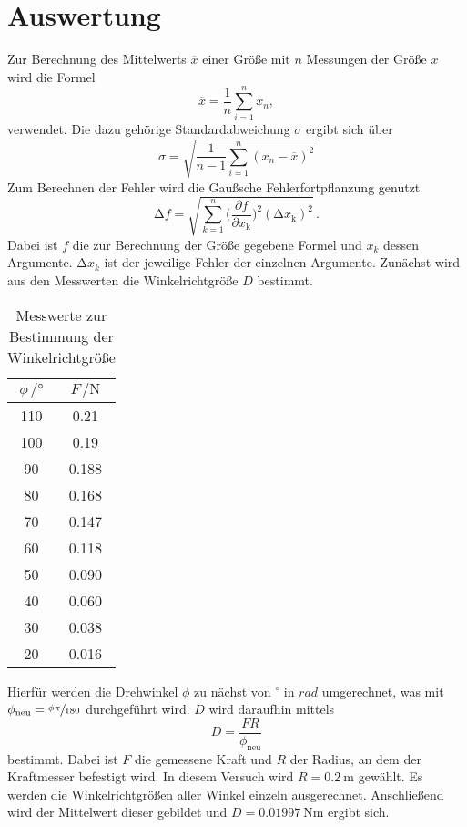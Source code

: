 \section{Auswertung}
\label{sec:Auswertung}
Zur Berechnung des Mittelwerts $\overline{x}$ einer Größe mit $n$ Messungen der Größe $x$ wird die Formel 
\begin{equation}
  \overline{x}=\frac{1}{n}\sum_{i=1}^n x_n,
  \label{eq:Mittelwert}
\end{equation} verwendet.
Die dazu gehörige Standardabweichung $\sigma$ ergibt sich über 
\begin{equation}
  \sigma=\sqrt{\frac{1}{n-1}\sum_{i=1}^n(x_n-\overline{x})^2}
  \label{eq:Standardabweichung}
\end{equation}
Zum Berechnen der Fehler wird die Gaußsche Fehlerfortpflanzung genutzt 
\begin{equation}
\increment f=\sqrt{\sum_{k=1}^{n}\biggl(\frac{\partial f}{\partial x_\text{k}}\biggr)^2(\increment x_\text{k})^2}\,.
\label{eq:gauss}
\end{equation}
Dabei ist $f$ die zur Berechnung der Größe gegebene Formel und $x_k$ dessen Argumente.
$\increment x_k$ ist der jeweilige Fehler der einzelnen Argumente.
Zunächst wird aus den Messwerten die Winkelrichtgröße $D$ bestimmt.
\begin{table}[H]
  \centering
  \caption{Messwerte zur Bestimmung der Winkelrichtgröße}
  \label{tab:Winkelrichtgroesse}
  \begin{tabular}{
  c c
  }
    \toprule
     $\phi \, / \unit{°}$ & $F\, / \unit{\newton}$\\
    \midrule
    110 & 0.21 \\
    100 & 0.19 \\
    90  & 0.188\\
    80  & 0.168\\
    70  & 0.147\\
    60  & 0.118\\
    50  & 0.090\\
    40  & 0.060\\
    30  & 0.038\\
    20  & 0.016\\
    \bottomrule
  \end{tabular}
\end{table}
Hierfür werden die Drehwinkel $\phi$ zu nächst von $^\circ$ in $rad$ umgerechnet, 
was mit $\phi_\text{neu} = \sfrac{\phi \pi}{180}$ durchgeführt wird.
$D$ wird daraufhin mittels
\begin{equation}
  D = \frac{F R}{\phi_\text{neu}}
\end{equation}
bestimmt.
Dabei ist $F$ die gemessene Kraft und $R$ der Radius, an dem der Kraftmesser befestigt wird.
In diesem Versuch wird $R = \SI{0.2}{\meter}$ gewählt.
Es werden die Winkelrichtgrößen aller Winkel einzeln ausgerechnet.
Anschließend wird der Mittelwert dieser gebildet und $D = \SI{0.01997}{\N \meter}$ ergibt sich.

